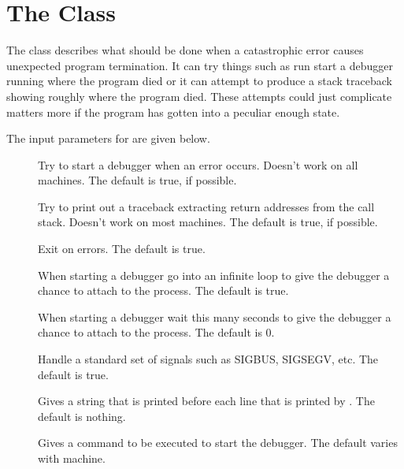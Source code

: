 
\section{The  Class}
\label{Debugger}

The  class describes what should be done when
a catastrophic error causes unexpected program termination.
It can try things such as run start a debugger running where
the program died or it can attempt to produce a stack traceback
showing roughly where the program died.  These attempts could
just complicate matters more if the program has gotten into
a peculiar enough state.

The  input parameters for  are given
below.

\begin{description}
 \item[] Try to start a debugger when an error occurs.
        Doesn't work on all machines. The default is true, if possible.

 \item[] Try to print out a traceback extracting return
        addresses from the call stack.  Doesn't work on most machines.  The
        default is true, if possible.

 \item[] Exit on errors.  The default is true.

 \item[] When starting a debugger go into an
        infinite loop to give the debugger a chance to attach to the
        process.  The default is true.

 \item[] When starting a debugger wait this many seconds to
        give the debugger a chance to attach to the process.  The default
        is 0.

 \item[] Handle a standard set of signals such as
        SIGBUS, SIGSEGV, etc.  The default is true.

 \item[] Gives a string that is printed before each line that
        is printed by . The default is nothing.

 \item[] Gives a command to be executed to start the debugger.
        The default varies with machine.

\end{description}
